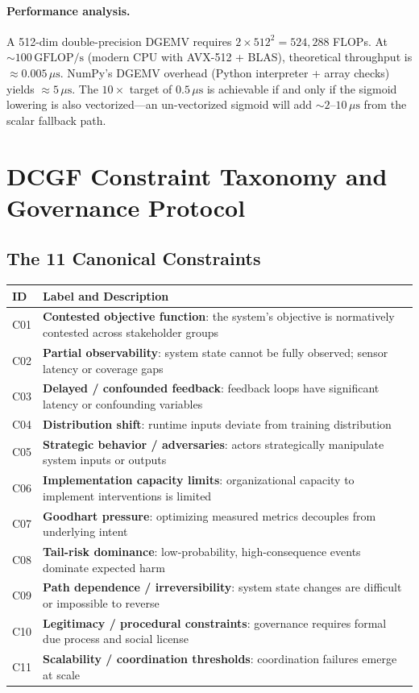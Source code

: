 \documentclass[11pt,letterpaper]{article}
\theoremstyle{remark}
\begin{document}
\paragraph{Performance analysis.}
A 512-dim double-precision DGEMV requires $2 \times 512^2 = 524{,}288$
FLOPs. At $\sim100\,\text{GFLOP/s}$ (modern CPU with AVX-512 + BLAS),
theoretical throughput is $\approx 0.005\,\mu\text{s}$. NumPy's DGEMV
overhead (Python interpreter + array checks) yields $\approx 5\,\mu\text{s}$.
The $10\times$ target of $0.5\,\mu\text{s}$ is achievable if and only if
the sigmoid lowering is also vectorized---an un-vectorized sigmoid will
add $\sim 2\text{--}10\,\mu\text{s}$ from the scalar fallback path.

\section{DCGF Constraint Taxonomy and Governance Protocol}

\subsection{The 11 Canonical Constraints}

\begin{longtable}{lp{10cm}}
\toprule
\textbf{ID} & \textbf{Label and Description} \\
\midrule
\endhead
C01 & \textbf{Contested objective function}: the system's objective is
  normatively contested across stakeholder groups \\
C02 & \textbf{Partial observability}: system state cannot be fully observed;
  sensor latency or coverage gaps \\
C03 & \textbf{Delayed / confounded feedback}: feedback loops have significant
  latency or confounding variables \\
C04 & \textbf{Distribution shift}: runtime inputs deviate from training
  distribution \\
C05 & \textbf{Strategic behavior / adversaries}: actors strategically
  manipulate system inputs or outputs \\
C06 & \textbf{Implementation capacity limits}: organizational capacity
  to implement interventions is limited \\
C07 & \textbf{Goodhart pressure}: optimizing measured metrics decouples
  from underlying intent \\
C08 & \textbf{Tail-risk dominance}: low-probability, high-consequence
  events dominate expected harm \\
C09 & \textbf{Path dependence / irreversibility}: system state changes
  are difficult or impossible to reverse \\
C10 & \textbf{Legitimacy / procedural constraints}: governance requires
  formal due process and social license \\
C11 & \textbf{Scalability / coordination thresholds}: coordination
  failures emerge at scale \\
\bottomrule
\end{longtable}
\end{document}

